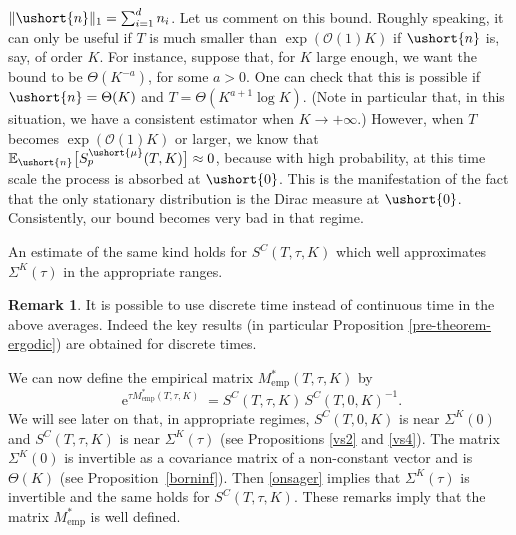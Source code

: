 \documentclass[11pt]{article}
\newcommand{\emp}{\mathrm{emp}}
\let\mathcal\mathscr
\numberwithin{equation}{section}
\theoremstyle{plain}
\theoremstyle{definition}
\newtheorem{remark}{Remark}[section]
\newcommand{\E}{{\mathbb{E}}}
\newcommand{\Oun}{\mathcal{O}(1)}
\newcommand{\sK}{K}
\newcommand{\vecn}{\ushort{n}}
\newcommand{\vmu}{\ushort{\mu}}
\newcommand{\veczer}{\ushort{0}}
\newcommand{\e}{\operatorname{e}}
\newcommand{\norm}[1]{\|#1\|_{1}}\let\snorm\norm
\begin{document}
$\norm{\vecn}=\sum_{i=1}^d n_i$.
Let us comment on this bound.
Roughly speaking, it can only be useful if $T$ is much smaller than $\exp(\Oun K)$ if $\vecn$ is, say, of order $K$.
For instance, suppose that, for $K$ large enough, we want the bound to be $\Theta(K^{-a})$, for some $a>0$. One can check that this is possible if
$\vecn=\Theta(K)$ and $T=\Theta(K^{a+1} \log K)$. (Note in particular that, in this situation, we have a consistent estimator when $K\to+\infty$.)
However, when $T$ becomes $\exp(\Oun K)$ or larger, we know that $\E_{\vecn}\bigl[S^{\vmu}_{p}(T,K)\bigr]\approx 0$, because with high
probability, at this time scale the process is absorbed at $\veczer$. This is the manifestation of the fact that the only stationary distribution is the Dirac
measure at $\veczer$. Consistently, our bound becomes very bad in that regime.

An estimate of the same kind holds for $S^{C}(T,\tau,K)$ which well approximates $\Sigma^{\sK}(\tau)$ in the appropriate ranges.

\begin{remark} It is possible to use discrete time instead of continuous time in the above averages. Indeed the key results (in particular Proposition
\ref{pre-theorem-ergodic}) are obtained for discrete times.
\end{remark}

We can now define the empirical matrix $M^{*}_\emp(T,\tau,K)$ by
\[
\e^{\tau M^{*}_\emp(T,\tau,K)}=S^{C}(T,\tau,K)\,S^{C}(T,0,K)^{-1}.
\]
We will see later on that, in appropriate regimes, $S^{C}(T,0,K)$ is near $\Sigma^K(0)$ and $S^{C}(T,\tau,K)$ is near $\Sigma^K(\tau)$
(see Propositions \ref{vs2} and \ref{vs4}). The matrix $\Sigma^K(0)$ is invertible as a covariance matrix of a non-constant vector and is $\Theta(K)$ (see Proposition~\ref{borninf}). Then \eqref{onsager} implies that $\Sigma^K(\tau)$ is invertible and the same holds for $S^{C}(T,\tau,K)$. These remarks imply
that the matrix $M^{*}_\emp$ is well defined.
\end{document}

